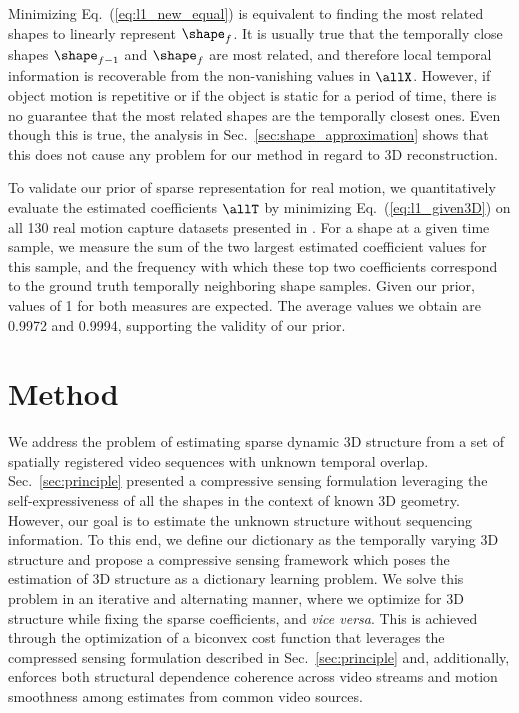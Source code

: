 Minimizing Eq.~(\ref{eq:l1_new_equal}) is equivalent to finding the most related shapes to linearly represent $\shape_f$. It is usually true that the temporally close shapes $\shape_{f-1}$ and $\shape_{f}$ are most related, and therefore local temporal information is recoverable from the non-vanishing values in $\allX$. However, if object motion is repetitive or if the object is static for a period of time, there is no guarantee that the most related shapes are the temporally closest ones. Even though this is true, the analysis in Sec.~\ref{sec:shape_approximation} shows that this does not cause any problem for our method in regard to 3D reconstruction. 

To validate our prior of sparse representation for real motion, we quantitatively evaluate the estimated coefficients $\allT$ by minimizing Eq.~(\ref{eq:l1_given3D}) on all 130 real motion capture datasets presented in \cite{cg-2007-2}. 
For a shape at a given time sample, we measure the sum of the two largest estimated coefficient values for this sample, and the frequency with which these top two coefficients correspond to the ground truth temporally neighboring shape samples. Given our prior, values of 1 for both measures are expected. The average values we obtain are 0.9972 and 0.9994, supporting the validity of our prior.



\section{Method}
\label{sec:method}

We address the problem of estimating sparse dynamic 3D structure from a set of spatially registered video sequences with unknown temporal overlap.
Sec.~\ref{sec:principle} presented a compressive sensing formulation leveraging the self-expressiveness of all the shapes in the context of known 3D geometry.
However, our goal is to estimate the unknown structure without sequencing information.
To this end, we define our dictionary as the temporally varying 3D structure and propose a compressive sensing framework which poses the estimation of 3D structure as a dictionary learning problem.
We solve this problem in an iterative and alternating manner, where we optimize for 3D structure while fixing the sparse coefficients, and {\em vice versa}.
This is achieved through the optimization of a biconvex cost function that leverages the compressed sensing formulation described in Sec.~\ref{sec:principle}  and, additionally, enforces both structural dependence coherence across video streams and motion smoothness among estimates from common video sources.

